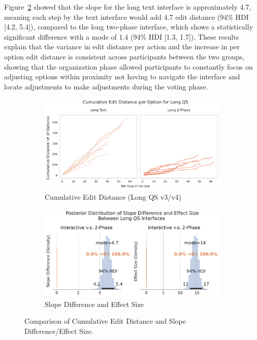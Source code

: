 Figure~\ref{fig:slope-diff-effect} showed that the slope for the long text interface is approximately 4.7, meaning each step by the text interface would add 4.7 edit distance (94\% HDI [4.2, 5.4]), compared to the long two-phase interface, which shows a statistically significant difference with a mode of 1.4 (94\% HDI [1.3, 1.7]). These results explain that the variance in edit distance per action and the increase in per option edit distance is consistent across participants between the two groups, showing that the organization phase allowed participants to constantly focus on adjusting options within proximity not having to navigate the interface and locate adjustments to make adjustments during the voting phase.

\begin{figure}[ht]
    \centering
    \begin{subfigure}[b]{0.48\textwidth}
        \centering
        \includegraphics[width=\textwidth]{content/image/distance/cumulative_edit_distance_per_option_long_qs_v3v4.pdf}
        \caption{Cumulative Edit Distance (Long QS v3/v4)}
        \label{fig:cumulative-distance}
    \end{subfigure}
    \begin{subfigure}[b]{0.48\textwidth}
        \centering
        \includegraphics[width=\textwidth]{content/image/distance/slope_diff_and_effect_size.pdf}
        \caption{Slope Difference and Effect Size}
        \label{fig:slope-diff-effect}
    \end{subfigure}
    \caption{Comparison of Cumulative Edit Distance and Slope Difference/Effect Size.}
    \label{fig:comparison}
\end{figure}

